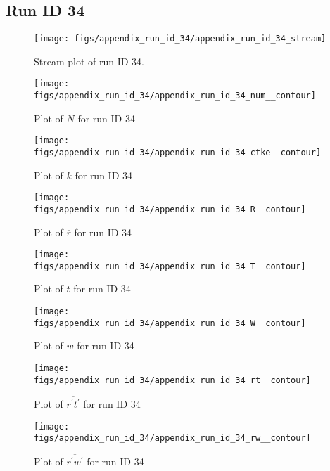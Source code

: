 \subsection{Run ID 34}
\begin{figure}[H]
\centering
\texttt{[image: figs/appendix\_run\_id\_34/appendix\_run\_id\_34\_stream]}
\caption{Stream plot of run ID 34.}
\label{fig:appendix_run_id_34_stream}
\end{figure}


\begin{figure}[H]
\centering
\texttt{[image: figs/appendix\_run\_id\_34/appendix\_run\_id\_34\_num\_\_contour]}
\caption{Plot of $N$ for run ID 34}
\label{fig:appendix_run_id_34_num__contour}
\end{figure}


\begin{figure}[H]
\centering
\texttt{[image: figs/appendix\_run\_id\_34/appendix\_run\_id\_34\_ctke\_\_contour]}
\caption{Plot of $k$ for run ID 34}
\label{fig:appendix_run_id_34_ctke__contour}
\end{figure}


\begin{figure}[H]
\centering
\texttt{[image: figs/appendix\_run\_id\_34/appendix\_run\_id\_34\_R\_\_contour]}
\caption{Plot of $\overline{r}$ for run ID 34}
\label{fig:appendix_run_id_34_R__contour}
\end{figure}


\begin{figure}[H]
\centering
\texttt{[image: figs/appendix\_run\_id\_34/appendix\_run\_id\_34\_T\_\_contour]}
\caption{Plot of $\overline{t}$ for run ID 34}
\label{fig:appendix_run_id_34_T__contour}
\end{figure}


\begin{figure}[H]
\centering
\texttt{[image: figs/appendix\_run\_id\_34/appendix\_run\_id\_34\_W\_\_contour]}
\caption{Plot of $\overline{w}$ for run ID 34}
\label{fig:appendix_run_id_34_W__contour}
\end{figure}


\begin{figure}[H]
\centering
\texttt{[image: figs/appendix\_run\_id\_34/appendix\_run\_id\_34\_rt\_\_contour]}
\caption{Plot of $\overline{r^\prime t^\prime}$ for run ID 34}
\label{fig:appendix_run_id_34_rt__contour}
\end{figure}


\begin{figure}[H]
\centering
\texttt{[image: figs/appendix\_run\_id\_34/appendix\_run\_id\_34\_rw\_\_contour]}
\caption{Plot of $\overline{r^\prime w^\prime}$ for run ID 34}
\label{fig:appendix_run_id_34_rw__contour}
\end{figure}


